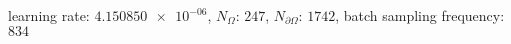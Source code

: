 learning rate: $\num[scientific-notation=true]{4.150850e-06}$, $N_{\Omega}$: $\num[scientific-notation=false]{247}$, $N_{\partial\Omega}$: $\num[scientific-notation=false]{1742}$, batch sampling frequency: $\num[scientific-notation=false]{834}$
